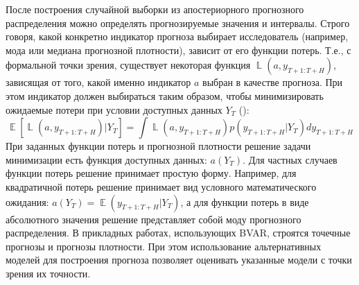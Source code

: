 \documentclass[11pt]{article} %
\DeclareMathOperator{\E}{\mathbb{E}}
\DeclareMathOperator{\Loss}{\mathbb{L}}
\DeclareMathOperator{\chol}{chol}
\let\vec\relax
\DeclareMathOperator{\vec}{vec}
\begin{document}
После построения случайной выборки из апостериорного прогнозного распределения можно определять прогнозируемые значения и интервалы. Строго говоря, какой конкретно индикатор прогноза выбирает исследователь (например, мода или медиана прогнозной плотности), зависит от его функции потерь. Т.е., с формальной точки зрения, существует некоторая функция $\Loss(a, y_{T+1:T+H})$, зависящая от того, какой именно индикатор $a$ выбран в качестве прогноза. При этом индикатор должен выбираться таким образом, чтобы минимизировать ожидаемые потери при условии доступных данных $Y_T$ (\cite[p.~3]{karlsson_2012}):
\begin{equation}
\E[\Loss(a,y_{T+1:T+H})|Y_T]=\int \Loss(a, y_{T+1:T+H}) p(y_{T+1:T+H}|Y_T) dy_{T+1:T+H}
\end{equation}
При заданных функции потерь и прогнозной плотности решение задачи минимизации есть функция доступных данных: $a(Y_T)$. Для частных случаев функции потерь решение принимает простую форму. Например, для квадратичной потерь решение принимает вид условного математического ожидания: $a(Y_T)=\E(y_{T+1:T+H}|Y_T)$, а для функции потерь в виде абсолютного значения  решение представляет собой моду прогнозного распределения.
В прикладных работах, использующих BVAR,  строятся точечные прогнозы и прогнозы плотности.  При этом использование альтернативных моделей для построения прогноза позволяет оценивать указанные модели с точки зрения их точности.
\end{document}
